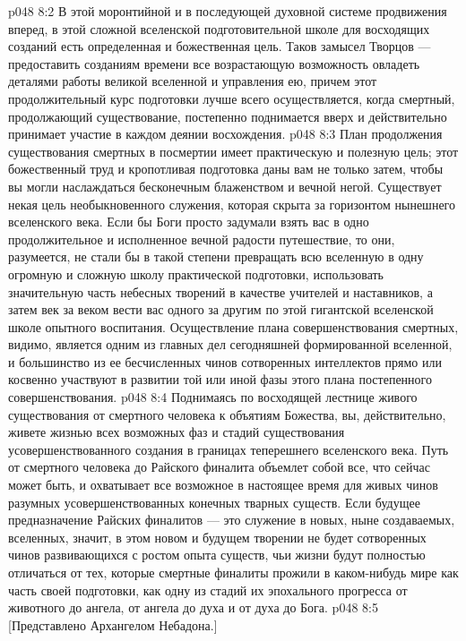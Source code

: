 \vs p048 8:2 В этой моронтийной и в последующей духовной системе продвижения вперед, в этой сложной вселенской подготовительной школе для восходящих созданий есть определенная и божественная цель. Таков замысел Творцов --- предоставить созданиям времени все возрастающую возможность овладеть деталями работы великой вселенной и управления ею, причем этот продолжительный курс подготовки лучше всего осуществляется, когда смертный, продолжающий существование, постепенно поднимается вверх и действительно принимает участие в каждом деянии восхождения.
\vs p048 8:3 План продолжения существования смертных в посмертии имеет практическую и полезную цель; этот божественный труд и кропотливая подготовка даны вам не только затем, чтобы вы могли наслаждаться бесконечным блаженством и вечной негой. Существует некая цель необыкновенного служения, которая скрыта за горизонтом нынешнего вселенского века. Если бы Боги просто задумали взять вас в одно продолжительное и исполненное вечной радости путешествие, то они, разумеется, не стали бы в такой степени превращать всю вселенную в одну огромную и сложную школу практической подготовки, использовать значительную часть небесных творений в качестве учителей и наставников, а затем век за веком вести вас одного за другим по этой гигантской вселенской школе опытного воспитания. Осуществление плана совершенствования смертных, видимо, является одним из главных дел сегодняшней формированной вселенной, и большинство из ее бесчисленных чинов сотворенных интеллектов прямо или косвенно участвуют в развитии той или иной фазы этого плана постепенного совершенствования.
\vs p048 8:4 Поднимаясь по восходящей лестнице живого существования от смертного человека к объятиям Божества, вы, действительно, живете жизнью всех возможных фаз и стадий существования усовершенствованного создания в границах теперешнего вселенского века. Путь от смертного человека до Райского финалита объемлет собой все, что сейчас может быть, и охватывает все возможное в настоящее время для живых чинов разумных усовершенствованных конечных тварных существ. Если будущее предназначение Райских финалитов --- это служение в новых, ныне создаваемых, вселенных, значит, в этом новом и будущем творении не будет сотворенных чинов развивающихся с ростом опыта существ, чьи жизни будут полностью отличаться от тех, которые смертные финалиты прожили в каком\hyp{}нибудь мире как часть своей подготовки, как одну из стадий их эпохального прогресса от животного до ангела, от ангела до духа и от духа до Бога.
\vs p048 8:5 [Представлено Архангелом Небадона.]
